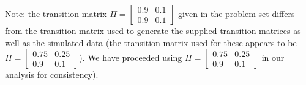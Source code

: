 \documentclass[12pt]{article}
\newenvironment{problem}[2][Problem]{\begin{trivlist}
\item[\hskip \labelsep {\bfseries #1}\hskip \labelsep {\bfseries #2.}]}{\end{trivlist}}
\begin{document}
Note: the transition matrix $\Pi = \begin{bmatrix} 0.9 & 0.1\\ 0.9 & 0.1\end{bmatrix}$ given in the problem set differs from the transition matrix used to generate the supplied transition matrices as well as the simulated data (the transition matrix used for these appears to be $\Pi = \begin{bmatrix} 0.75 & 0.25\\0.9 & 0.1\end{bmatrix}$). We have proceeded using $\Pi = \begin{bmatrix} 0.75 & 0.25\\0.9 & 0.1\end{bmatrix}$ in our analysis for consistency).

\begin{problem}{1}
\end{problem}
\end{document}

